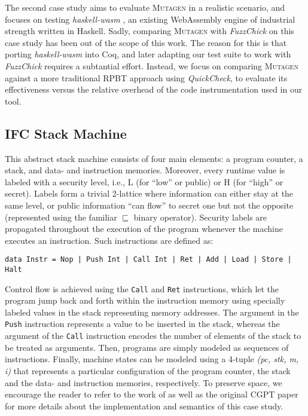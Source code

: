 \documentclass[sigconf, anonymous, review]{acmart}
\newcommand{\quickcheck}{\textit{QuickCheck}\xspace}
\newcommand{\fuzzchick}{\textit{FuzzChick}\xspace}
\newcommand{\mutagen}{\textsc{Mutagen}\xspace}
\begin{document}
The second case study aims to evaluate \mutagen in a realistic scenario,
and focuses on testing \textit{haskell-wasm} \cite{haskellwasm}, an existing
WebAssembly engine of industrial strength written in Haskell.
%
%
Sadly, comparing \mutagen with \fuzzchick on this case study has been out of the
scope of this work.
%
The reason for this is that porting \textit{haskell-wasm} into Coq, and later
adapting our test suite to work with \fuzzchick requires a subtantial effort.
%
Instead, we focus on comparing \mutagen against a more traditional RPBT approach
using \quickcheck, to evaluate its effectiveness versus the relative overhead of
the code instrumentation used in our tool.




\subsection{IFC Stack Machine}

This abstract stack machine consists of four main elements: a program counter, a
stack, and data- and instruction memories.
%
Moreover, every runtime value is labeled with a security level, i.e., L (for
``low'' or public) or H (for ``high'' or secret).
%
Labels form a trivial 2-lattice where information can either stay at the same
level, or public information ``can flow'' to secret one but not the opposite
(represented using the familiar $\sqsubseteq$ binary operator).
%
Security labels are propagated throughout the execution of the program whenever
the machine executes an instruction.
%
Such instructions are defined as:
%
\begin{verbatim}
data Instr = Nop | Push Int | Call Int | Ret | Add | Load | Store | Halt
\end{verbatim}

\noindent Control flow is achieved using the \texttt{Call} and \texttt{Ret}
instructions, which let the program jump back and forth within the instruction
memory using specially labeled values in the stack representing memory
addresses.
%
The argument in the \texttt{Push} instruction represents a value to be
inserted in the stack, whereas the argument of the \texttt{Call} instruction
encodes the number of elements of the stack to be treated as arguments.
%
Then, programs are simply modeled as sequences of instructions.
%
Finally, machine states can be modeled using a 4-tuple \textit{(pc, stk, m, i)}
that represents a particular configuration of the program counter, the stack and
the data- and instruction memories, respectively.
%
To preserve space, we encourage the reader to refer to the work of
\citeauthor{hritcu2013testing} \citeyearpar{hritcu2013testing,
  hrictcu2016testing} as well as the original CGPT paper
\cite{lampropoulos2019coverage} for more details about the implementation and
semantics of this case study.
\end{document}
